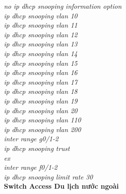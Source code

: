 \documentclass[12pt,a4paper]{report}
\begin{document}
\hspace*{2cm}\textit{no ip dhcp snooping information option\\
\hspace*{2cm}ip dhcp snooping vlan 10\\
\hspace*{2cm}ip dhcp snooping vlan 11\\
\hspace*{2cm}ip dhcp snooping vlan 12\\
\hspace*{2cm}ip dhcp snooping vlan 13\\
\hspace*{2cm}ip dhcp snooping vlan 14\\
\hspace*{2cm}ip dhcp snooping vlan 15\\
\hspace*{2cm}ip dhcp snooping vlan 16\\
\hspace*{2cm}ip dhcp snooping vlan 17\\
\hspace*{2cm}ip dhcp snooping vlan 18\\
\hspace*{2cm}ip dhcp snooping vlan 19\\
\hspace*{2cm}ip dhcp snooping vlan 20\\
\hspace*{2cm}ip dhcp snooping vlan 110\\
\hspace*{2cm}ip dhcp snooping vlan 200\\
\hspace*{2cm}inter range g0/1-2\\
\hspace*{2cm}ip dhcp snooping trust\\
\hspace*{2cm}ex\\
\hspace*{2cm}inter range f0/1-2\\
\hspace*{2cm}ip dhcp snooping limit rate 30\\}
\hspace*{1cm}\textbf{Switch Access Du lịch nước ngoài}\\
\end{document}
